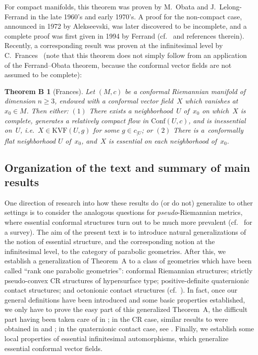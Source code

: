 \documentclass[pdftex]{sigma}
\theoremstyle{plain}
\theoremstyle{definition}
\newtheorem*{TheoremB}{Theorem B}
\begin{document}
For compact manifolds, this theorem was proven by M.~Obata and J.~Lelong-Ferrand in the late 1960's and early 1970's. A proof for the non-compact case, announced in 1972 by Alekseevski, was later discovered to be incomplete, and a complete proof was f\/irst given in 1994 by Ferrand (cf.~\cite{Ferrand, FrEss} and references therein). Recently, a corresponding result was proven at the inf\/initesimal level by C.~Frances~\cite{Frances3} (note that this theorem does not simply follow from an application of the Ferrand--Obata theorem, because the conformal vector f\/ields are not assumed to be complete):

\begin{TheoremB}[Frances] \label{TheoremB}
\it Let $(M,c)$ be a conformal Riemannian manifold of dimension $n \geq 3$, endowed with a conformal vector f\/ield~$X$ which vanishes at $x_0 \in M$. Then either: $(1)$ There exists a neighborhood~$U$ of~$x_0$ on which~$X$ is complete, generates a relatively compact flow in $\mathrm{Conf}(U,c)$, and is inessential on~$U$, i.e.\ $X \in \mathrm{KVF}(U,g)$ for some $g \in c_{\vert U}$; or $(2)$ There is a~conformally flat neighborhood $U$ of~$x_0$, and~$X$ is essential on each neighborhood of~$x_0$.
\end{TheoremB}


\subsection{Organization of the text and summary of main results}

One direction of research into how these results do (or do not) generalize to other settings is to consider the analogous questions for \emph{pseudo}-Riemannian metrics, where essential conformal structures turn out to be much more prevalent (cf.~\cite{FrEss} for a survey). The aim of the present text is to introduce natural generalizations of the notion of essential structure, and the corresponding notion at the inf\/initesimal level, to the category of parabolic geometries. After this, we establish a generalization of Theorem~A to a class of geometries which have been called ``rank one parabolic geometries'': conformal Riemannian structures; strictly pseudo-convex CR structures of hypersurface type; positive-def\/inite quaternionic contact structures; and octonionic contact structures (cf.~\cite{Biquard}). In fact, once our general def\/initions have been introduced and some basic properties established, we only have to prove the easy part of this generalized Theorem~A, the dif\/f\/icult part having been taken care of in \cite{Frances}; in the CR case, similar results to \cite{Frances} were obtained in \cite{Schoen} and \cite{Webster}; in the quaternionic contact case, see \cite{IvVass}. Finally, we establish some local properties of essential inf\/initesimal automorphisms, which generalize essential conformal vector f\/ields.
\end{document}
